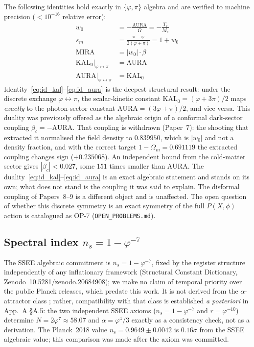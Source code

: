 \documentclass[12pt,a4paper]{article}
\begin{document}
The following identities hold exactly in $\{\varphi,\pi\}$ algebra and are
verified to machine precision ($<10^{-16}$ relative error):
\begin{align}
  w_0 &= -\frac{\mathrm{AURA}}{\Omega}
       = -\frac{T_r}{M_v} \label{eq:id_w0} \\
  s_m &= \frac{\pi-\varphi}{2(\varphi+\pi)}
       = 1 + w_0 \label{eq:id_sm} \\
  \mathrm{MIRA} &= |w_0|\cdot\beta \label{eq:id_mira} \\
  \mathrm{KAL}_0\big|_{\varphi\leftrightarrow\pi} &= \mathrm{AURA} \label{eq:id_kal} \\
  \mathrm{AURA}\big|_{\varphi\leftrightarrow\pi} &= \mathrm{KAL}_0 \label{eq:id_aura}
\end{align}
Identity~\eqref{eq:id_kal}--\eqref{eq:id_aura} is the deepest structural result:
under the discrete exchange $\varphi\leftrightarrow\pi$, the scalar-kinetic constant
$\mathrm{KAL}_0=(\varphi+3\pi)/2$ maps \emph{exactly} to the photon-sector constant
$\mathrm{AURA}=(3\varphi+\pi)/2$, and vice versa.
This duality was previously offered as the algebraic origin of a conformal
dark-sector coupling $\beta_c = -\mathrm{AURA}$.  That coupling is withdrawn
(Paper~7): the shooting that extracted it normalised the field density to
$0.839950$, which is $|w_0|$ and not a density fraction, and with the correct
target $1-\Omega_m = 0.691119$ the extracted coupling changes sign
($+0.235068$).  An independent bound from the cold-matter sector gives
$|\beta_c| < 0.027$, some $151$ times smaller than $\mathrm{AURA}$.  The
duality~\eqref{eq:id_kal}--\eqref{eq:id_aura} is an exact algebraic statement and stands on
its own; what does not stand is the coupling it was said to explain.  The
disformal coupling of Papers~8--9 is a different object and is unaffected.
The open question of whether this discrete symmetry is an exact symmetry of the full
$P(X,\phi)$ action is catalogued as OP-7 (\texttt{OPEN\_PROBLEMS.md}).

\subsection*{Spectral index $n_s = 1 - \varphi^{-7}$}

The SSEE algebraic commitment is $n_s = 1 - \varphi^{-7}$, fixed by the
register structure independently of any inflationary framework
(Structural Constant Dictionary, Zenodo~10.5281/zenodo.20684908); we make no
claim of temporal priority over the public Planck releases, which predate this work.
It is not derived from the $\alpha$-attractor class
\citep{Starobinsky1980,KalloshLinde2013,Ferrara2013}; rather, compatibility with
that class is established \emph{a posteriori} in App.~A §A.5: the two
independent SSEE axioms ($n_s = 1-\varphi^{-7}$ and $r = \varphi^{-10}$)
determine $N = 2\varphi^7\approx58.07$ and $\alpha = \varphi^4/3$ exactly
as a consistency check, not as a derivation.
The Planck~2018 value \citep{Akrami2020} $n_s = 0.9649\pm0.0042$ is $0.16\sigma$ from the
SSEE algebraic value; this comparison was made after the axiom was committed.
\end{document}
